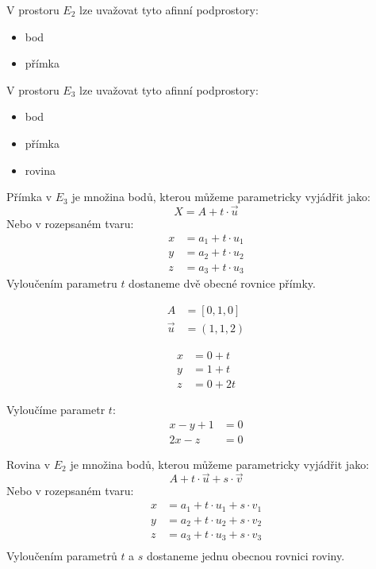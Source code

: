 V prostoru $E_2$ lze uvažovat tyto afinní podprostory:
\begin{itemize}
    \item bod
    \item přímka
\end{itemize}

V prostoru $E_3$ lze uvažovat tyto afinní podprostory:
\begin{itemize}
    \item bod
    \item přímka
    \item rovina
\end{itemize}

\begin{definition}[Přímka v $E_3$]
    Přímka v $E_3$ je množina bodů, kterou můžeme parametricky vyjádřit jako:
    $$X = A + t\cdot \vec{u}$$
    Nebo v rozepsaném tvaru:
    \begin{align*}
        x &= a_1 + t \cdot u_1\\
        y &= a_2 + t \cdot u_2\\
        z &= a_3 + t \cdot u_3
    \end{align*}
    Vyloučením parametru $t$ dostaneme dvě obecné rovnice přímky.
\end{definition}

\begin{example}
    \begin{align*}
        A &= [0, 1, 0]\\
        \vec{u} &= (1, 1, 2)
    \end{align*}

    \begin{align*}
        x &= 0 + t\\
        y &= 1 + t\\
        z &= 0 + 2t
    \end{align*}

    Vyloučíme parametr $t$:
    \begin{align*}
        x -y + 1&= 0\\
        2x -z &=0
    \end{align*}
\end{example}

\begin{definition}[Rovina v $E_3$]
    Rovina v $E_2$ je množina bodů, kterou můžeme parametricky vyjádřit jako:
    $$A + t\cdot \vec{u} + s \cdot \vec{v}$$
    Nebo v rozepsaném tvaru:
    \begin{align*}
        x &= a_1 + t\cdot u_1 + s \cdot v_1\\
        y &= a_2 + t\cdot u_2 + s \cdot v_2\\
        z &= a_3 + t\cdot u_3 + s \cdot v_3\\
    \end{align*}
    Vyloučením parametrů $t$ a $s$ dostaneme jednu obecnou rovnici roviny.
\end{definition}

